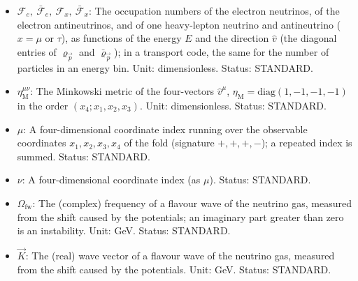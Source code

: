 \documentclass[
  10pt,
]{article}
\begin{document}
\begin{itemize}
  \(\pi\): The number pi, the ratio of the circumference of a circle to
  its diameter. Unit: dimensionless. Value: 3.141592654. Status:
  STANDARD.
\item
  \(\mathcal{F}_{e},\ \bar{\mathcal{F}}_{e},\ \mathcal{F}_{x},\ \bar{\mathcal{F}}_{x}\):
  The occupation numbers of the electron neutrinos, of the electron
  antineutrinos, and of one heavy-lepton neutrino and antineutrino
  (\(x = \mu\) or \(\tau\)), as functions of the energy \(E\) and the
  direction \(\hat v\) (the diagonal entries of \(\varrho_{\vec p}\) and
  \(\bar\varrho_{\vec p}\)); in a transport code, the same for the
  number of particles in an energy bin. Unit: dimensionless. Status:
  STANDARD.
\item
  \(\eta_{\mathrm{M}}^{\mu\nu}\): The Minkowski metric of the
  four-vectors \(\hat v^\mu\),
  \(\eta_{\mathrm{M}} = \mathrm{diag}(1, -1, -1, -1)\) in the order
  \((x_4; x_1, x_2, x_3)\). Unit: dimensionless. Status: STANDARD.
\item
  \(\mu\): A four-dimensional coordinate index running over the
  observable coordinates \(x_1, x_2, x_3, x_4\) of the fold (signature
  \(+,+,+,-\)); a repeated index is summed. Status: STANDARD.
\item
  \(\nu\): A four-dimensional coordinate index (as \(\mu\)). Status:
  STANDARD.
\item
  \(\Omega_{\mathrm{fw}}\): The (complex) frequency of a flavour wave of
  the neutrino gas, measured from the shift caused by the potentials; an
  imaginary part greater than zero is an instability. Unit: GeV. Status:
  STANDARD.
\item
  \(\vec K\): The (real) wave vector of a flavour wave of the neutrino
  gas, measured from the shift caused by the potentials. Unit: GeV.
  Status: STANDARD.
\end{itemize}
\end{document}
